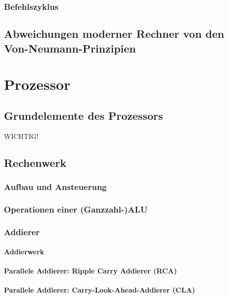 \subsection{Befehlszyklus}


\section{Abweichungen moderner Rechner von den Von-Neumann-Prinzipien}

\chapter{Prozessor}
\section*{Grundelemente des Prozessors} WICHTIG!
\section{Rechenwerk}
\subsection*{Aufbau und Ansteuerung}
\subsection*{Operationen einer (Ganzzahl-)ALU}

\subsection{Addierer}
\subsubsection*{Addierwerk}
\subsubsection*{Parallele Addierer: Ripple Carry Addierer (RCA)}
\subsubsection*{Parallele Addierer: Carry-Look-Ahead-Addierer (CLA)}

